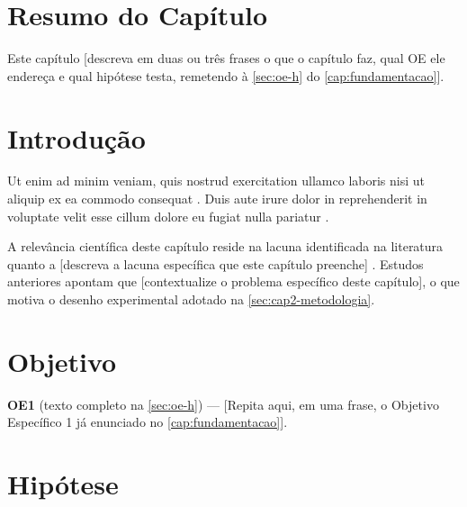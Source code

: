 %
%

\section{Resumo do Capítulo}
\label{sec:cap2-resumo}

Este capítulo [descreva em duas ou três frases o que o capítulo faz,
qual OE ele endereça e qual hipótese testa, remetendo à
\autoref{sec:oe-h} do \autoref{cap:fundamentacao}].

\section{Introdução}
\label{sec:cap2-introducao}

Ut enim ad minim veniam, quis nostrud exercitation ullamco laboris nisi
ut aliquip ex ea commodo consequat \cite{exemplo:artigo:2024}. Duis aute
irure dolor in reprehenderit in voluptate velit esse cillum dolore eu
fugiat nulla pariatur \cite{exemplo:livro:2020}.

A relevância científica deste capítulo reside na lacuna identificada
na literatura quanto a [descreva a lacuna específica que este capítulo
preenche] \cite{exemplo:capitulo:2019}. Estudos anteriores
\cite{exemplo:anais:2023} apontam que [contextualize o problema
específico deste capítulo], o que motiva o desenho experimental
adotado na \autoref{sec:cap2-metodologia}.

\section{Objetivo}
\label{sec:cap2-objetivo}

\textbf{OE1} (texto completo na \autoref{sec:oe-h}) — [Repita aqui,
em uma frase, o Objetivo Específico 1 já enunciado no
\autoref{cap:fundamentacao}].

\section{Hipótese}
\label{sec:cap2-hipotese}

